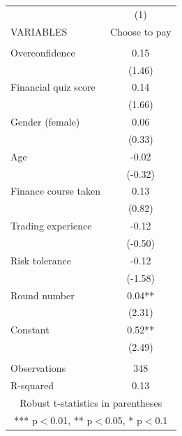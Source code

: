 \documentclass[]{article}
\begin{document}
\begin{tabular}{lc} \hline
 & (1) \\
VARIABLES & Choose to pay \\ \hline
 &  \\
Overconfidence & 0.15 \\
 & (1.46) \\
Financial quiz score & 0.14 \\
 & (1.66) \\
Gender (female) & 0.06 \\
 & (0.33) \\
Age & -0.02 \\
 & (-0.32) \\
Finance course taken & 0.13 \\
 & (0.82) \\
Trading experience & -0.12 \\
 & (-0.50) \\
Risk tolerance & -0.12 \\
 & (-1.58) \\
Round number & 0.04** \\
 & (2.31) \\
Constant & 0.52** \\
 & (2.49) \\
 &  \\
Observations & 348 \\
 R-squared & 0.13 \\ \hline
\multicolumn{2}{c}{ Robust t-statistics in parentheses} \\
\multicolumn{2}{c}{ *** p$<$0.01, ** p$<$0.05, * p$<$0.1} \\
\end{tabular}
\end{document}
